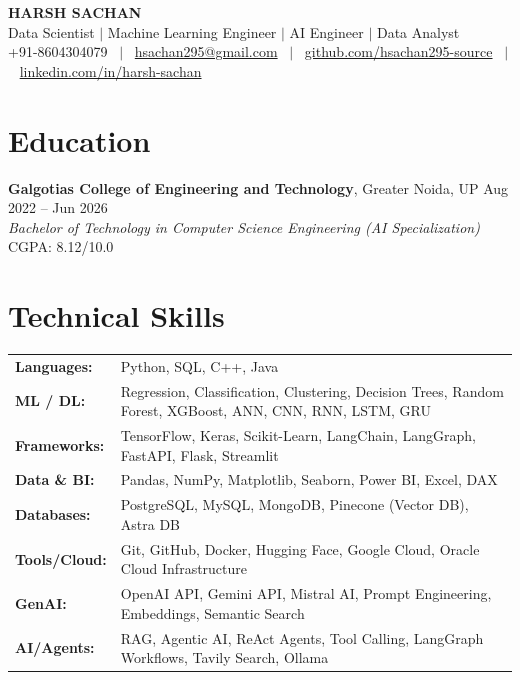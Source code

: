 \documentclass[a4paper,9pt]{article}
\begin{document}
\begin{center}
{\Large \textbf{HARSH SACHAN}}\\[2pt]
{\small Data Scientist $|$ Machine Learning Engineer $|$ AI Engineer $|$ Data Analyst}\\[2pt]
{\small
+91-8604304079 ~$|$~
\href{mailto:hsachan295@gmail.com}{hsachan295@gmail.com} ~$|$~
\href{https://github.com/hsachan295-source}{github.com/hsachan295-source} ~$|$~
\href{https://www.linkedin.com/in/harsh-sachan-b3b24a2a2}{linkedin.com/in/harsh-sachan}
}
\end{center}

\vspace{-3mm}

\section{Education}
\noindent
\textbf{Galgotias College of Engineering and Technology}, Greater Noida, UP \hfill Aug 2022 -- Jun 2026\\
\textit{Bachelor of Technology in Computer Science Engineering (AI Specialization)} \hfill CGPA: 8.12/10.0

\vspace{-2mm}

\section{Technical Skills}
\noindent
\begin{tabular}{@{}p{2.3cm} p{15.1cm}}
\textbf{Languages:}   & Python, SQL, C++, Java \\[1pt]
\textbf{ML / DL:}     & Regression, Classification, Clustering, Decision Trees, Random Forest, XGBoost, ANN, CNN, RNN, LSTM, GRU \\[1pt]
\textbf{Frameworks:}  & TensorFlow, Keras, Scikit-Learn, LangChain, LangGraph, FastAPI, Flask, Streamlit \\[1pt]
\textbf{Data \& BI:}  & Pandas, NumPy, Matplotlib, Seaborn, Power BI, Excel, DAX \\[1pt]
\textbf{Databases:}   & PostgreSQL, MySQL, MongoDB, Pinecone (Vector DB), Astra DB \\[1pt]
\textbf{Tools/Cloud:} & Git, GitHub, Docker, Hugging Face, Google Cloud, Oracle Cloud Infrastructure \\[1pt]
\textbf{GenAI:}       & OpenAI API, Gemini API, Mistral AI, Prompt Engineering, Embeddings, Semantic Search \\[1pt]
\textbf{AI/Agents:}   & RAG, Agentic AI, ReAct Agents, Tool Calling, LangGraph Workflows, Tavily Search, Ollama \\
\end{tabular}
\end{document}
